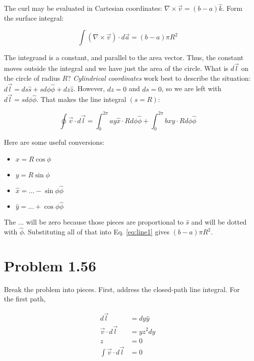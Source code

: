 \documentclass[10pt]{article}
\begin{document}
The curl may be evaluated in Cartesian coordinates: $\nabla \times \vec{v} = (b-a)\hat{k}$.  Form the surface integral:

\begin{equation}
\int (\nabla \times \vec{v}) \cdot d\vec{a} = (b-a) \pi R^2
\end{equation}

The integrand is a constant, and parallel to the area vector.  Thus, the constant moves outside the integral and we have just the area of the circle.  What is $d\vec{l}$ on the circle of radius $R$?  \textit{Cylindrical coordinates} work best to describe the situation: $d\vec{l} = ds \hat{s} + s d\phi \hat{\phi} + dz \hat{z}$.  However, $dz = 0$ and $ds = 0$, so we are left with $d\vec{l} = s d\phi \hat{\phi}$.  That makes the line integral $(s = R)$:

\begin{equation}
\oint \vec{v} \cdot d\vec{l} = \int_0^{2\pi} ay \hat{x} \cdot R d\phi \hat{\phi} + \int_0^{2\pi} bx \hat{y} \cdot R d\phi \hat{\phi} \label{eq:line1}
\end{equation}

Here are some useful conversions:
\begin{itemize}
\item $x = R\cos\phi$
\item $y = R\sin\phi$
\item $\hat{x} = ... - \sin\phi \hat{\phi}$
\item $\hat{y} = ... + \cos\phi \hat{\phi}$
\end{itemize}
The $...$ will be zero because those pieces are proportional to $\hat{s}$ and will be dotted with $\hat{\phi}$.  Substituting all of that into Eq. \ref{eq:line1} gives $(b-a) \pi R^2$.

\clearpage

\section{Problem 1.56}

Break the problem into pieces.  First, address the closed-path line integral.  For the first path,

\begin{align}
d\vec{l} &= dy \hat{y} \\
\vec{v} \cdot d\vec{l} &= y z^2 dy \\
z &= 0 \\
\int \vec{v} \cdot d\vec{l} &= 0
\end{align}
\end{document}
